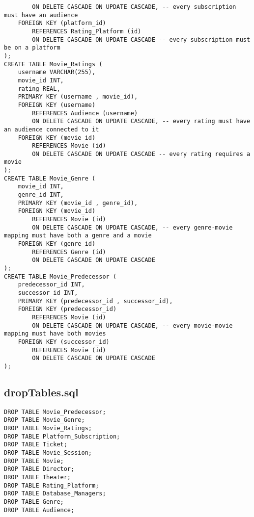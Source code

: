 \documentclass[12pt, A4, titlepage]{article}
\begin{document}
\begin{verbatim}
        ON DELETE CASCADE ON UPDATE CASCADE, -- every subscription must have an audience
    FOREIGN KEY (platform_id)
        REFERENCES Rating_Platform (id)
        ON DELETE CASCADE ON UPDATE CASCADE -- every subscription must be on a platform
);
CREATE TABLE Movie_Ratings (
    username VARCHAR(255),
    movie_id INT,
    rating REAL,
    PRIMARY KEY (username , movie_id),
    FOREIGN KEY (username)
        REFERENCES Audience (username)
        ON DELETE CASCADE ON UPDATE CASCADE, -- every rating must have an audience connected to it
    FOREIGN KEY (movie_id)
        REFERENCES Movie (id)
        ON DELETE CASCADE ON UPDATE CASCADE -- every rating requires a movie
);
CREATE TABLE Movie_Genre (
    movie_id INT,
    genre_id INT,
    PRIMARY KEY (movie_id , genre_id),
    FOREIGN KEY (movie_id)
        REFERENCES Movie (id)
        ON DELETE CASCADE ON UPDATE CASCADE, -- every genre-movie mapping must have both a genre and a movie
    FOREIGN KEY (genre_id)
        REFERENCES Genre (id)
        ON DELETE CASCADE ON UPDATE CASCADE
);
CREATE TABLE Movie_Predecessor (
    predecessor_id INT,
    successor_id INT,
    PRIMARY KEY (predecessor_id , successor_id),
    FOREIGN KEY (predecessor_id)
        REFERENCES Movie (id)
        ON DELETE CASCADE ON UPDATE CASCADE, -- every movie-movie mapping must have both movies 
    FOREIGN KEY (successor_id)
        REFERENCES Movie (id)
        ON DELETE CASCADE ON UPDATE CASCADE
);
\end{verbatim}

\subsection{dropTables.sql}
\begin{verbatim}
DROP TABLE Movie_Predecessor;
DROP TABLE Movie_Genre;
DROP TABLE Movie_Ratings;
DROP TABLE Platform_Subscription;
DROP TABLE Ticket;
DROP TABLE Movie_Session;
DROP TABLE Movie;
DROP TABLE Director;
DROP TABLE Theater;
DROP TABLE Rating_Platform;
DROP TABLE Database_Managers;
DROP TABLE Genre;
DROP TABLE Audience;
\end{verbatim}
\end{document}
